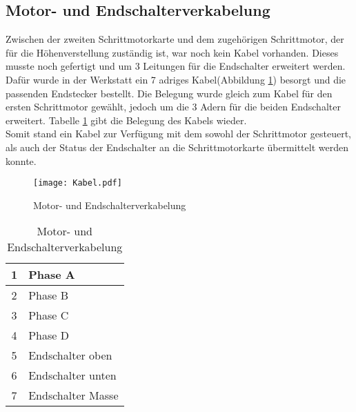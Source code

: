 \subsection{Motor- und Endschalterverkabelung}
Zwischen der zweiten Schrittmotorkarte und dem zugehörigen Schrittmotor, der für die Höhenverstellung zuständig ist, war noch kein Kabel vorhanden. Dieses musste noch gefertigt und um 3 Leitungen für die Endschalter erweitert werden.\\
Dafür wurde in der Werkstatt ein 7 adriges Kabel(Abbildung \ref{fig:Motorverkabelung}) besorgt und die passenden Endstecker bestellt. Die Belegung wurde gleich zum Kabel für den ersten Schrittmotor gewählt, jedoch um die 3 Adern für die beiden Endschalter erweitert. Tabelle \ref{tab:Motorverkabelung} gibt die Belegung des Kabels wieder.\\
Somit stand ein Kabel zur Verfügung mit dem sowohl der Schrittmotor gesteuert, als auch der Status der Endschalter an die Schrittmotorkarte übermittelt werden konnte.
\begin{figure}[h]
\centering
\texttt{[image: Kabel.pdf]}
\caption{Motor- und Endschalterverkabelung}
\label{fig:Motorverkabelung}
\end{figure}
\begin{longtable}{|c|l|} 
\caption{Motor- und Endschalterverkabelung} \\
\hline
\label{tab:Motorverkabelung}
1 & Phase A \\ 
\hline 
2 & Phase B \\ 
\hline 
3 & Phase C \\ 
\hline 
4 & Phase D \\ 
\hline 
5 & Endschalter oben \\ 
\hline 
6 & Endschalter unten \\ 
\hline 
7 & Endschalter Masse \\ 
\hline 
\end{longtable} 

